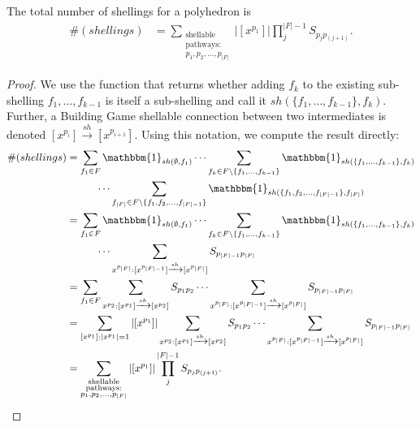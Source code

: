 \begin{mythm}
The total number of shellings for a polyhedron is  
\begin{align}
\#(shellings) &= \sum_{\substack{\text{shellable} \\ \text{pathways}: \\ p_1, p_2, \dots, p_{|F|} }}|[x^{p_1}]|\prod_j^{|F|-1}S_{p_jp_{(j+1)}} .
\end{align}
\end{mythm}
\begin{proof}
We use the function that returns whether adding $f_k$ to the existing sub-shelling $f_1,\dots,f_{k-1}$ is itself a sub-shelling and call it $sh(\{f_1,\dots,f_{k-1}\}, f_k)$. Further, a Building Game shellable connection between two intermediates is denoted  $[x^{p_i}] \xrightarrow{sh} [x^{p_{i+1}}]$. Using this notation, we compute the result directly:
\begin{align*}
\#(shellings) &= \sum_{f_1 \in F} \mathbbm{1}_{sh(\emptyset,f_1)} \cdots\sum_{f_k \in F\setminus \{f_1,\dots,f_{k-1}\}} \mathbbm{1}_{sh(\{f_1,\dots,f_{k-1}\}, f_k)} \\
&\hspace{1cm} \cdots \sum_{f_{|F|} \in F\setminus \{f_1, f_2, \dots, f_{|F|-1}\}}\mathbbm{1}_{sh(\{f_1, f_2, \dots, f_{|F|-1}\},f_{|F|})}  \\
&= \sum_{f_1 \in F} \mathbbm{1}_{sh(\emptyset,f_1)} \cdots\sum_{f_k \in F\setminus \{f_1,\dots,f_{k-1}\}} \mathbbm{1}_{sh(\{f_1,\dots,f_{k-1}\}, f_k)} \\
&\hspace{1cm} \cdots \sum_{x^{p_{|F|}}: [x^{p_{|F|-1}}] \xrightarrow{sh} [x^{p_{|F|}}]} S_{p_{|F|-1}p_{|F|}}  \\
&= \sum_{f_1 \in F} \sum_{x^{p_2}: [x^{p_1}] \xrightarrow{sh} [x^{p_2}]} S_{p_{1}p_{2}}  \cdots \sum_{x^{p_{|F|}}: [x^{p_{|F|-1}}] \xrightarrow{sh} [x^{p_{|F|}}]} S_{p_{|F|-1}p_{|F|}}  \\
&= \sum_{[x^{p_1}] : |x^{p_1}| = 1} |[x^{p_1}]| \sum_{x^{p_2}: [x^{p_1}] \xrightarrow{sh} [x^{p_2}]} S_{p_{1}p_{2}}  \cdots \sum_{x^{p_{|F|}}: [x^{p_{|F|-1}}] \xrightarrow{sh} [x^{p_{|F|}}]} S_{p_{|F|-1}p_{|F|}}  \\
&= \sum_{\substack{\text{shellable} \\ \text{pathways}: \\ p_1, p_2, \dots, p_{|F|} }}|[x^{p_1}]|\prod_j^{|F|-1}S_{p_jp_{(j+1)}}. 
\end{align*}
\end{proof}

